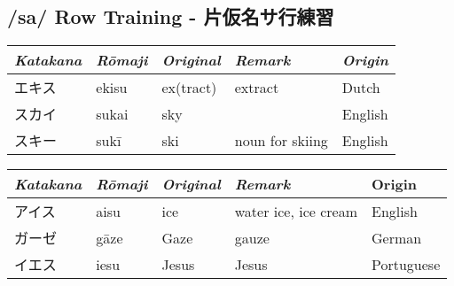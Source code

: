 \subsection{/sa/ Row Training - 片仮名サ行練習}\label{sec:SaRowTraining}
\Padding
\begin{longtable}[c]{p{2cm}p{2cm}p{3cm}p{6cm}p{2cm}}
\textit{Katakana}&\textit{Rōmaji}&\textit{Original}&\textit{Remark}&\textit{Origin}\\\hline
エキス&ekisu&ex(tract)&extract&Dutch\\
スカイ&sukai&sky&&English\\
スキー&sukī&ski&noun for skiing&English\\
\end{longtable}


\newpage

\Padding
\begin{longtable}[c]{p{2cm}p{2cm}p{3cm}p{6cm}p{2cm}}
\textit{Katakana}&\textit{Rōmaji}&\textit{Original}&\textit{Remark}&Origin\\\hline
アイス&aisu&ice&water ice, ice cream&English\\
ガーゼ&gāze&Gaze&gauze&German\\
イエス&iesu&Jesus&Jesus&Portuguese\\
\end{longtable}


\newpage
